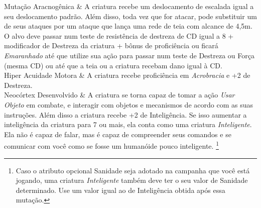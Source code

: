 \documentclass[letterpaper,twocolumn,openany]{dndbook}
\begin{document}
{\begin{dndtable}
		Mutação Aracnogênica & A criatura recebe um deslocamento de escalada igual a seu deslocamento padrão. Além disso, toda vez que for atacar, pode substituir um de seus ataques por um ataque que lança uma rede de teia com alcance de 4,5m. O alvo deve passar num teste de resistência de destreza de CD igual a 8 + modificador de Destreza da criatura + bônus de proficiência ou ficará \textit{Emaranhado} até que utilize sua ação para passar num teste de Destreza ou Força (mesma CD) ou até que a teia ou a criatura recebam dano igual à CD. \\
		Hiper Acuidade Motora & A criatura recebe proficiência em \textit{Acrobracia} e +2 de Destreza. \\
		Neocórtex Desenvolvido & A criatura se torna capaz de tomar a ação \textit{Usar Objeto} em combate, e interagir com objetos e mecanismos de acordo com as suas instruções. Além disso a criatura recebe +2 de Inteligência. Se isso aumentar a inteligência da criatura para 7 ou mais, ela conta como uma criatura \textit{Inteligente}. Ela não é capaz de falar, mas é capaz de compreender seus comandos e se comunicar com você como se fosse um humanóide pouco inteligente. \footnote{Caso o atributo opcional Sanidade seja adotado na campanha que você está jogando, uma criatura \textit{Inteligente} também deve ter o seu valor de Sanidade determinado. Use um valor igual ao de Inteligência obtida após essa mutação.}
	\end{dndtable}
	}
	\twocolumn
	
\end{document}
